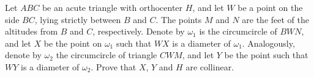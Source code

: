 Let $ABC$ be an acute triangle with orthocenter $H$,  and let $W$ be a point on the side $BC$,  lying strictly between $B$ and $C$.
The points $M$ and $N$ are the feet of the altitudes from $B$ and $C$,  respectively.
Denote by $\omega_1$ is the circumcircle of $BWN$,  and let $X$ be the point on $\omega_1$ such that $WX$ is a diameter of $\omega_1$.
Analogously, denote by $\omega_2$ the circumcircle of triangle $CWM$,  and let $Y$ be the point such that $WY$ is a diameter of $\omega_2$.
Prove that $X$, $Y$ and $H$ are collinear.
